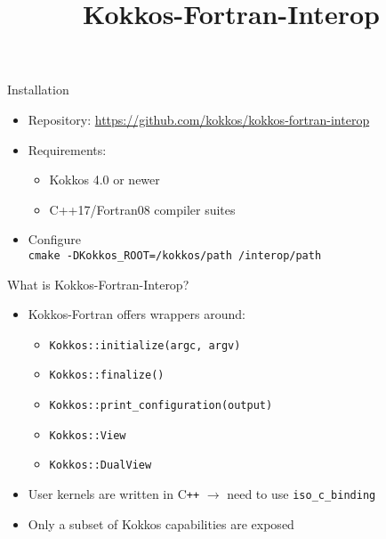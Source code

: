 


\title{Kokkos-Fortran-Interop}



\usepackage{minted}



\begin{frame}
	\titlepage
\end{frame}

\begin{frame}{Installation}
  \begin{itemize}
    \item Repository: \url{https://github.com/kokkos/kokkos-fortran-interop}
    \item Requirements:
      \begin{itemize}
        \item Kokkos 4.0 or newer
        \item C++17/Fortran08 compiler suites
      \end{itemize}
    \item Configure\\
      \texttt{cmake -DKokkos\_ROOT=/kokkos/path /interop/path}
  \end{itemize}
\end{frame}

\begin{frame}{What is Kokkos-Fortran-Interop?}
  \begin{itemize}
    \item Kokkos-Fortran offers wrappers around:
      \begin{itemize}
        \item \texttt{Kokkos::initialize(argc, argv)}
        \item \texttt{Kokkos::finalize()}
        \item \texttt{Kokkos::print\_configuration(output)}
        \item \texttt{Kokkos::View} 
        \item \texttt{Kokkos::DualView}
      \end{itemize}
    \item User kernels are written in C\texttt{++} $\rightarrow$ need to use
      \texttt{iso\_c\_binding}
    \item Only a subset of Kokkos capabilities are exposed
  \end{itemize}
\end{frame}

